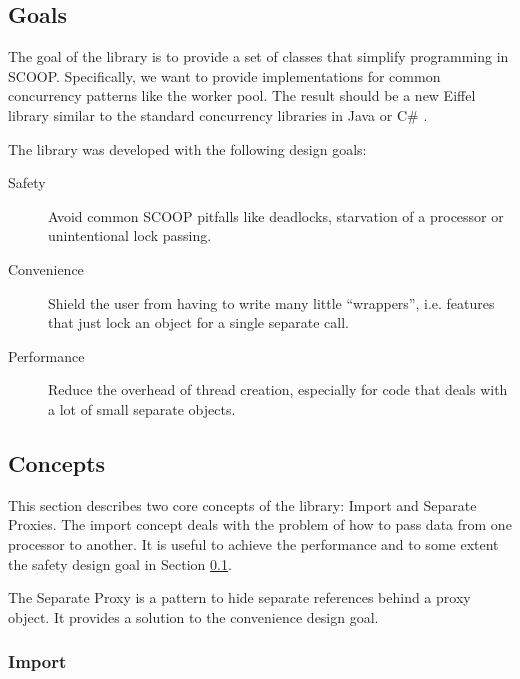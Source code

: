 \documentclass[a4paper,10pt]{article}
\begin{document}
 
\subsection{Goals}
\label{sec:goals}

The goal of the library is to provide a set of classes that simplify programming in SCOOP. 
Specifically, we want to provide implementations for common concurrency patterns like the worker pool.
The result should be a new Eiffel library similar to the standard concurrency libraries in Java \cite{web:java-concurrency} or C\# \cite{web:ms-tpl}.

The library was developed with the following design goals:

\begin{description}
 \item [Safety]\label{item:safety} Avoid common SCOOP pitfalls like deadlocks, starvation of a processor or unintentional lock passing.
 \item [Convenience]\label{item:convenience} Shield the user from having to write many little ``wrappers'', i.e. features that just lock an object for a single separate call.
 \item [Performance]\label{item:performance} Reduce the overhead of thread creation, especially for code that deals with a lot of small separate objects.
\end{description}

\subsection{Concepts}

This section describes two core concepts of the library: Import and Separate Proxies.
The import concept deals with the problem of how to pass data from one processor to another.
It is useful to achieve the performance and to some extent the safety design goal in Section \ref{sec:goals}.

The Separate Proxy  is a pattern to hide separate references behind a proxy object.
It provides a solution to the convenience design goal.

\subsubsection{Import}
\label{sec:concepts:import}
\end{document}
